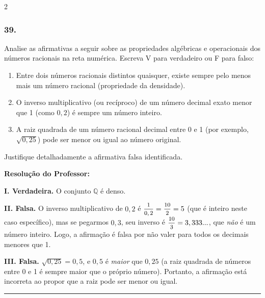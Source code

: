 \begin{multicols*}{2}
\subsubsection*{39.} Analise as afirmativas a seguir sobre as propriedades algébricas e operacionais dos números racionais na reta numérica. Escreva V para verdadeiro ou F para falso:
\begin{enumerate}[label=\Roman*., itemsep=\espacoAlt]
    \item Entre dois números racionais distintos quaisquer, existe sempre pelo menos mais um número racional (propriedade da densidade).
    \item O inverso multiplicativo (ou recíproco) de um número decimal exato menor que 1 (como $0,2$) é sempre um número inteiro.
    \item A raiz quadrada de um número racional decimal entre 0 e 1 (por exemplo, $\sqrt{0,25}$) pode ser menor ou igual ao número original.
\end{enumerate}
Justifique detalhadamente a afirmativa falsa identificada.

\ifgabarito
    \begin{tcolorbox}[colback=CorTitUm!5, colframe=CorTitUm, boxrule=1pt, arc=4pt, left=6pt, right=6pt, top=6pt, bottom=6pt]
    \small\textbf{\textcolor{CorTitUm}{Resolução do Professor:}}\par\vspace{0.1cm}
    \color{CinzaEscuro}
    \textbf{I. Verdadeira.} O conjunto $\mathbb{Q}$ é denso.
    
    \textbf{II. Falsa.} O inverso multiplicativo de $0,2$ é $\mfrac{1}{0,2} = \mfrac{10}{2} = 5$ (que é inteiro neste caso específico), mas se pegarmos $0,3$, seu inverso é $\mfrac{10}{3} = 3,333...$, que \textit{não} é um número inteiro. Logo, a afirmação é falsa por não valer para todos os decimais menores que 1.
    
    \textbf{III. Falsa.} $\sqrt{0,25} = 0,5$, e $0,5$ é \textit{maior} que $0,25$ (a raiz quadrada de números entre 0 e 1 é sempre maior que o próprio número). Portanto, a afirmação está incorreta ao propor que a raiz pode ser menor ou igual.
    \end{tcolorbox}
\fi

\par\vspace{\espacoQuestao}

\noindent\textcolor{CorLinha}{\rule{\linewidth}{0.5pt}} 
\par\vspace{\espacoPreQuestao}

\end{multicols*}

